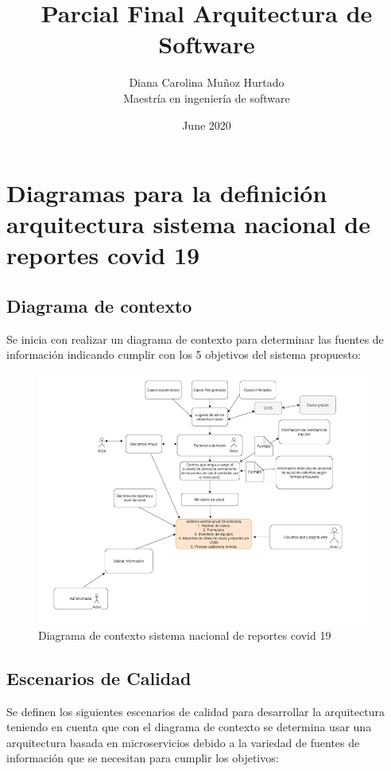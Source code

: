 \documentclass{article}
\title{Parcial Final Arquitectura de Software}
\author{Diana Carolina Muñoz Hurtado \\ Maestría en ingeniería de software }
\date{June 2020}
\begin{document}
\maketitle

\section{Diagramas para la definición arquitectura sistema nacional de reportes covid 19}

\subsection{Diagrama de contexto}

Se inicia con realizar un diagrama de contexto para determinar las fuentes de información indicando cumplir con los 5 objetivos del sistema propuesto:

\begin{figure}[h] 
    \centering
    \includegraphics[scale=0.5]{Context.png}
    \caption{Diagrama de contexto sistema nacional de reportes covid 19}
    \label{Arqui}
\end{figure}

\newpage


\subsection{Escenarios de Calidad}

Se definen los siguientes escenarios de calidad para desarrollar la arquitectura teniendo en cuenta que con el diagrama de contexto se determina usar una arquitectura basada en microservicios debido a la variedad de fuentes de información que se necesitan para cumplir los objetivos:
\end{document}
